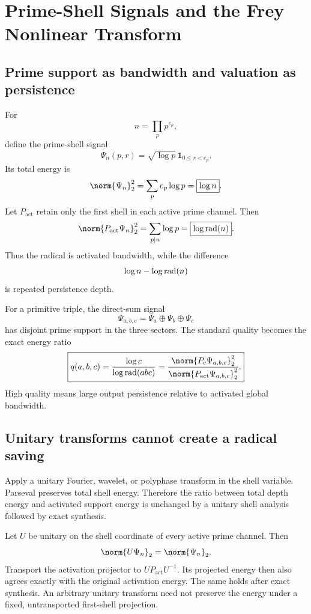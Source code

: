 \clearpage
\section{Prime-Shell Signals and the Frey Nonlinear Transform}

\subsection{Prime support as bandwidth and valuation as persistence}
For
\[
 n=\prod_p p^{e_p},
\]
define the prime-shell signal
\[
 \Psi_n(p,r)
 =
 \sqrt{\log p}\,\mathbf 1_{0\le r<e_p}.
\]
Its total energy is
\[
 \norm{\Psi_n}_2^2
 =
 \sum_p e_p\log p
 =
 \boxed{\log n}.
\]
Let $P_{\mathrm{act}}$ retain only the first shell in each active prime channel. Then
\[
 \norm{P_{\mathrm{act}}\Psi_n}_2^2
 =
 \sum_{p\mid n}\log p
 =
 \boxed{\log\rad(n)}.
\]
Thus the radical is activated bandwidth, while the difference
\[
 \log n-\log\operatorname{rad}(n)
\]
is repeated persistence depth.

For a primitive triple, the direct-sum signal
\[
 \Psi_{a,b,c}
 =
 \Psi_a\oplus\Psi_b\oplus\Psi_c
\]
has disjoint prime support in the three sectors. The standard quality becomes the exact energy ratio
\[
 \boxed{
 q(a,b,c)
 =
 \frac{\log c}{\log\rad(abc)}
 =
 \frac{\norm{P_c\Psi_{a,b,c}}_2^2}
 {\norm{P_{\mathrm{act}}\Psi_{a,b,c}}_2^2}.
 }
\]
High quality means large output persistence relative to activated global bandwidth.

\subsection{Unitary transforms cannot create a radical saving}
Apply a unitary Fourier, wavelet, or polyphase transform in the shell variable. Parseval preserves total shell energy. Therefore the ratio between total depth energy and activated support energy is unchanged by a unitary shell analysis followed by exact synthesis.

\begin{proposition}
Let $U$ be unitary on the shell coordinate of every active prime channel. Then
\[
 \norm{U\Psi_n}_2=\norm{\Psi_n}_2.
\]
Transport the activation projector to $UP_{\mathrm{act}}U^{-1}$. Its projected energy then also agrees exactly with the original activation energy. The same holds after exact synthesis. An arbitrary unitary transform need not preserve the energy under a fixed, untransported first-shell projection.
\end{proposition}

